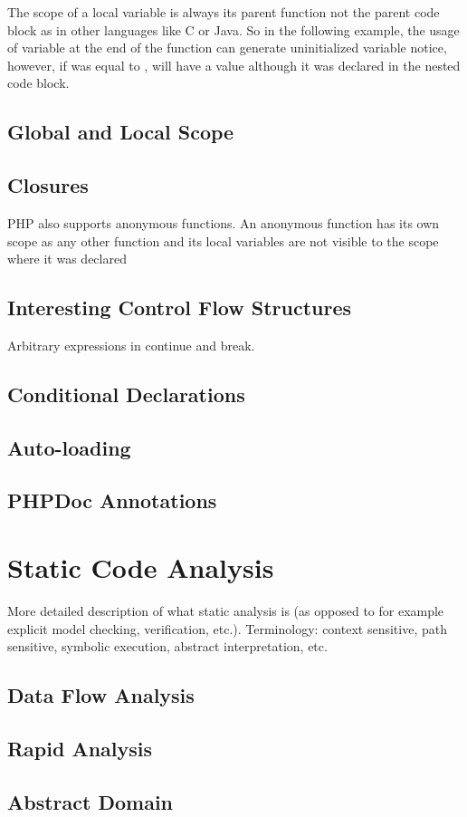     The scope of a local variable is always its parent function not the 
    parent code block as in other languages like C or Java. So in the following 
    example, the usage of variable  at the end of the function 
    can generate uninitialized variable notice, however, if  
    was equal to ,  will have a value although it 
    was declared in the nested code block.

    
    \subsection{Global and Local Scope}

    \subsection{Closures}
    PHP also supports anonymous functions. An anonymous function has its 
    own scope as any other function and its local variables are not visible 
    to the scope where it was declared

    \subsection{Interesting Control Flow Structures}
    Arbitrary expressions in continue and break.
    
    \subsection{Conditional Declarations}
                
    \subsection{Auto-loading}
    
    \subsection{PHPDoc Annotations}
    
    \section{Static Code Analysis}
        More detailed description of what static analysis is 
        (as opposed to for example explicit model checking, 
        verification, etc.). Terminology: context sensitive, 
        path sensitive, symbolic execution, abstract interpretation, etc.    
    
        \subsection{Data Flow Analysis}
        \subsection{Rapid Analysis}
        \subsection{Abstract Domain}
